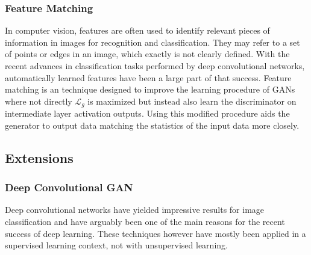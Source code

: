 


\subsubsection{Feature Matching}
\label{ssub:gan_feature_matching}
In computer vision, features are often used to identify relevant pieces of information in images for recognition and classification.
They may refer to a set of points or edges in an image, which exactly is not clearly defined.
With the recent advances in classification tasks performed by deep convolutional networks, automatically learned features have been a large part of that success.
Feature matching is an technique designed to improve the learning procedure of GANs where not directly $\mathcal{L}_g$ is maximized but instead also learn the discriminator on intermediate layer activation outputs.
Using this modified procedure aids the generator to output data matching the statistics of the input data more closely.






\subsection{Extensions}
\label{sub:gan_extensions}

\subsubsection{Deep Convolutional GAN}
\label{ssub:dcgan}
Deep convolutional networks\cite{lecun-89e} have yielded impressive results for image classification \cite{imagenet:2012} and have arguably been one of the main reasons for the recent success of deep learning.
These techniques however have mostly been applied in a supervised learning context, not with unsupervised learning.

